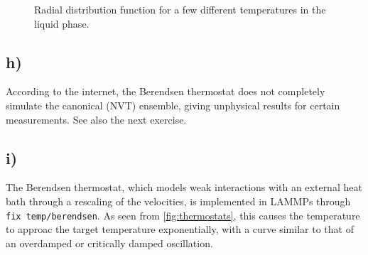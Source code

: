 \documentclass[11pt,british,a4paper]{report}
\begin{document}
\begin{figure}[htbp]
    \centering
    \caption{Radial distribution function for a few different temperatures in the liquid phase.}%
    \label{fig:rdfliquid}
\end{figure}

\subsection*{h)}
According to the internet\cite{lemak_berendsen_1994}, the Berendsen thermostat does not completely simulate the canonical (NVT) ensemble, giving unphysical results for certain measurements. See also the next exercise.

\subsection*{i)}
The Berendsen thermostat, which models weak interactions with an external heat bath through a rescaling of the velocities, is implemented in LAMMPs through \texttt{fix temp/berendsen}. As seen from \vref{fig:thermostats}, this causes the temperature to approac the target temperature exponentially, with a curve similar to that of an overdamped or critically damped oscillation.
\end{document}
